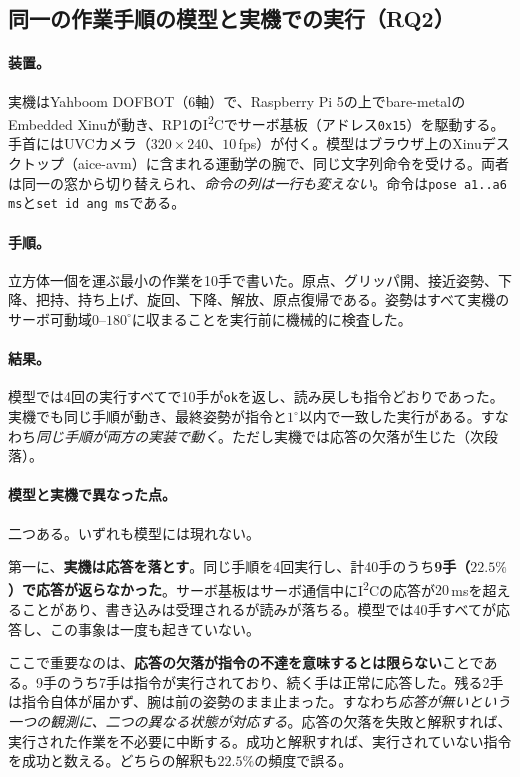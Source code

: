 \documentclass[10pt,letterpaper]{article}
\begin{document}
\subsection{同一の作業手順の模型と実機での実行（RQ2）}\label{sec:both}
\paragraph{装置。}実機はYahboom DOFBOT（6軸）で、Raspberry Pi 5の上でbare-metalのEmbedded Xinuが動き、RP1のI\textsuperscript{2}Cでサーボ基板（アドレス\texttt{0x15}）を駆動する。手首にはUVCカメラ（$320\times240$、$10$\,fps）が付く。模型はブラウザ上のXinuデスクトップ（aice-avm）に含まれる運動学の腕で、同じ文字列命令を受ける。両者は同一の窓から切り替えられ、\emph{命令の列は一行も変えない}。命令は\texttt{pose a1..a6 ms}と\texttt{set id ang ms}である。

\paragraph{手順。}立方体一個を運ぶ最小の作業を10手で書いた。原点、グリッパ開、接近姿勢、下降、把持、持ち上げ、旋回、下降、解放、原点復帰である。姿勢はすべて実機のサーボ可動域$0$--$180^{\circ}$に収まることを実行前に機械的に検査した。

\paragraph{結果。}模型では4回の実行すべてで10手が\texttt{ok}を返し、読み戻しも指令どおりであった。実機でも同じ手順が動き、最終姿勢が指令と$1^{\circ}$以内で一致した実行がある。すなわち\emph{同じ手順が両方の実装で動く}。ただし実機では応答の欠落が生じた（次段落）。

\paragraph{模型と実機で異なった点。}二つある。いずれも模型には現れない。

第一に、\textbf{実機は応答を落とす}。同じ手順を4回実行し、計40手のうち\textbf{9手（$22.5\%$）で応答が返らなかった}。サーボ基板はサーボ通信中にI\textsuperscript{2}Cの応答が$20$\,msを超えることがあり、書き込みは受理されるが読みが落ちる。模型では40手すべてが応答し、この事象は一度も起きていない。

ここで重要なのは、\textbf{応答の欠落が指令の不達を意味するとは限らない}ことである。9手のうち7手は指令が実行されており、続く手は正常に応答した。残る2手は指令自体が届かず、腕は前の姿勢のまま止まった。すなわち\emph{応答が無いという一つの観測に、二つの異なる状態が対応する}。応答の欠落を失敗と解釈すれば、実行された作業を不必要に中断する。成功と解釈すれば、実行されていない指令を成功と数える。どちらの解釈も$22.5\%$の頻度で誤る。
\end{document}
